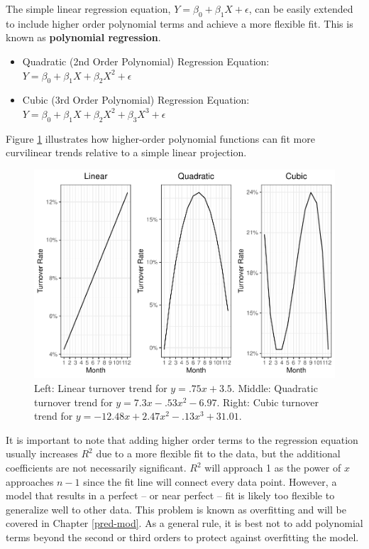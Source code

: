 \documentclass[
]{book}
\providecommand{\tightlist}{%
  \setlength{\itemsep}{0pt}\setlength{\parskip}{0pt}}
\begin{document}
The simple linear regression equation, \(Y = \beta_0 + \beta_1 X + \epsilon\), can be easily extended to include higher order polynomial terms and achieve a more flexible fit. This is known as \textbf{polynomial regression}.

\begin{itemize}
\tightlist
\item
  Quadratic (2nd Order Polynomial) Regression Equation: \(Y = \beta_0 + \beta_1 X + \beta_2 X^2 + \epsilon\)
\item
  Cubic (3rd Order Polynomial) Regression Equation: \(Y = \beta_0 + \beta_1 X + \beta_2 X^2 + \beta_3 X^3 + \epsilon\)
\end{itemize}

Figure \ref{fig:poly-fun} illustrates how higher-order polynomial functions can fit more curvilinear trends relative to a simple linear projection.

\begin{figure}

{\centering \includegraphics[width=1\linewidth]{The_Fundamentals_of_People_Analytics_files/figure-latex/poly-fun-1} 

}

\caption{Left: Linear turnover trend for $y = .75x + 3.5$. Middle: Quadratic turnover trend for $y = 7.3x - .53x^2 - 6.97$. Right: Cubic turnover trend for $y = -12.48x + 2.47x^2 - .13x^3 + 31.01$.}\label{fig:poly-fun}
\end{figure}

It is important to note that adding higher order terms to the regression equation usually increases \(R^2\) due to a more flexible fit to the data, but the additional coefficients are not necessarily significant. \(R^2\) will approach 1 as the power of \(x\) approaches \(n-1\) since the fit line will connect every data point. However, a model that results in a perfect -- or near perfect -- fit is likely too flexible to generalize well to other data. This problem is known as overfitting and will be covered in Chapter \ref{pred-mod}. As a general rule, it is best not to add polynomial terms beyond the second or third orders to protect against overfitting the model.
\end{document}
